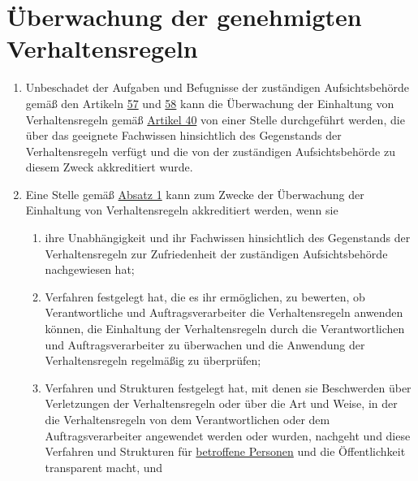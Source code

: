 \chapter{Überwachung der genehmigten Verhaltensregeln}
\label{ch:41}


\begin{enumerate}

  \item Unbeschadet der Aufgaben und Befugnisse der zuständigen Aufsichtsbehörde gemäß den Artikeln \hyperref[ch:57]
   {57} und \hyperref[ch:58]{58} kann die Überwachung der Einhaltung von Verhaltensregeln gemäß \hyperref[ch:40]
   {Artikel 40} von einer Stelle durchgeführt werden, die über das geeignete Fachwissen hinsichtlich des Gegenstands
   der Verhaltensregeln verfügt und die von der zuständigen Aufsichtsbehörde zu diesem Zweck akkreditiert wurde.
  \label{itm:41-1}

  \item Eine Stelle gemäß \hyperref[itm:41-1]{Absatz 1} kann zum Zwecke der Überwachung der Einhaltung von
   Verhaltensregeln akkreditiert werden, wenn sie
  \label{itm:41-2}

  \begin{enumerate}
  
    \item ihre Unabhängigkeit und ihr Fachwissen hinsichtlich des Gegenstands der Verhaltensregeln zur Zufriedenheit der
     zuständigen Aufsichtsbehörde nachgewiesen hat;
    \label{itm:41-2a}

    \item Verfahren festgelegt hat, die es ihr ermöglichen, zu bewerten, ob Verantwortliche und Auftragsverarbeiter die
     Verhaltensregeln anwenden können, die Einhaltung der Verhaltensregeln durch die Verantwortlichen und
     Auftragsverarbeiter zu überwachen und die Anwendung der Verhaltensregeln regelmäßig zu überprüfen;
    \label{itm:41-2b}

    \item Verfahren und Strukturen festgelegt hat, mit denen sie Beschwerden über Verletzungen der Verhaltensregeln oder
     über die Art und Weise, in der die Verhaltensregeln von dem Verantwortlichen oder dem Auftragsverarbeiter
     angewendet werden oder wurden, nachgeht und diese Verfahren und Strukturen für \hyperref[itm:04-1]{betroffene Personen} und die
     Öffentlichkeit transparent macht, und
    \label{itm:41-2c}


\end{enumerate}
\end{enumerate}
